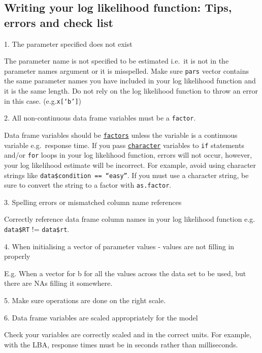 \documentclass[]{book}
\begin{document}
\hypertarget{writing-your-log-likelihood-function-tips-errors-and-check-list}{%
\subsection{Writing your log likelihood function: Tips, errors and check list}\label{writing-your-log-likelihood-function-tips-errors-and-check-list}}

1. The parameter specified does not exist

The parameter name is not specified to be estimated i.e.~it is not in the parameter names argument or it is misspelled. Make sure \texttt{pars} vector contains the same parameter names you have included in your log likelihood function and it is the same length. Do not rely on the log likelihood function to throw an error in this case.
(e.g.\texttt{x{[}‘b’{]}})

2. All non-continuous data frame variables must be a \texttt{factor}.

Data frame variables should be \href{https://www.rdocumentation.org/packages/base/versions/3.6.2/topics/factor}{\texttt{factors}} unless the variable is a continuous variable e.g.~response time.
If you pass \href{https://www.rdocumentation.org/packages/base/versions/3.6.2/topics/character}{\texttt{character}} variables to \texttt{if} statements and/or \texttt{for} loops in your log likelihood function, errors will not occur, however, your log likelihood estimate will be incorrect. For example,
avoid using character strings like \texttt{data\$condition\ ==\ “easy”}. If you must use a character string, be sure to convert the string to a factor with \texttt{as.factor}.

3. Spelling errors or mismatched column name references

Correctly reference data frame column names in your log likelihood function e.g. \texttt{data\$RT} != \texttt{data\$rt}.

4. When initialising a vector of parameter values - values are not filling in properly

E.g. When a vector for b for all the values across the data set to be used, but there are NAs filling it somewhere.

5. Make sure operations are done on the right scale.

6. Data frame variables are scaled appropriately for the model

Check your variables are correctly scaled and in the correct units. For example, with the LBA, response times must be in seconds rather than milliseconds.
\end{document}
